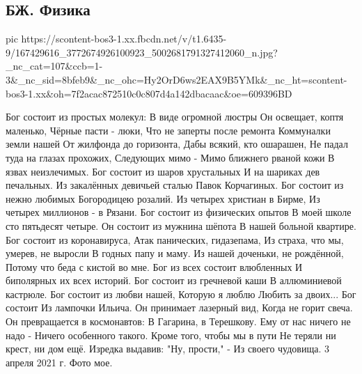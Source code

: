 
 
 
 
 

\subsection{БЖ. Физика}
\label{sec:03_04_2021.fb.bilchenko_evgenia.1.fizika_bog}


\ifcmt
  pic https://scontent-bos3-1.xx.fbcdn.net/v/t1.6435-9/167429616_3772674926100923_5002681791327412060_n.jpg?_nc_cat=107&ccb=1-3&_nc_sid=8bfeb9&_nc_ohc=Hy2OrD6ws2EAX9B5YMk&_nc_ht=scontent-bos3-1.xx&oh=7f2acac872510c0c807d4a142dbacaac&oe=609396BD
\fi


Бог состоит из простых молекул:
В виде огромной люстры
Он освещает, коптя маленько,
Чёрные пасти - люки,
Что не заперты после ремонта
Коммуналки земли нашей
От жилфонда до горизонта,
Дабы всякий, кто ошарашен,
Не падал туда на глазах прохожих,
Следующих мимо -
Мимо ближнего рваной кожи
В язвах неизлечимых.
Бог состоит из шаров хрустальных
И на шариках дев печальных.
Из закалённых девичьей сталью
Павок Корчагиных.
Бог состоит из нежно любимых
Богородицею розалий.
Из четырех христиан в Бирме,
Из четырех миллионов - в Рязани.
Бог состоит из физических опытов
В моей школе сто пятьдесят четыре.
Он состоит из мужнина шёпота
В нашей больной квартире.
Бог состоит из коронавируса,
Атак панических, гидазепама,
Из страха, что мы, умерев, не выросли
В годных папу и маму.
Из нашей доченьки, не рождённой,
Потому что беда с кистой во мне.
Бог из всех состоит влюбленных 
И биполярных их всех историй.
Бог состоит из гречневой каши
В аллюминиевой кастрюле.
Бог состоит из любви нашей,
Которую я люблю
Любить за двоих... Бог состоит
Из лампочки Ильича.
Он принимает лазерный вид,
Когда не горит свеча.
Он превращается в космонавтов:
В Гагарина, в Терешкову.
Ему от нас ничего не надо  -
Ничего особенного такого.
Кроме того, чтобы мы в пути
Не теряли ни крест, ни дом ещё.
Изредка выдавив: "Ну, прости," -
Из своего чудовища.
3 апреля 2021 г.
Фото мое.

